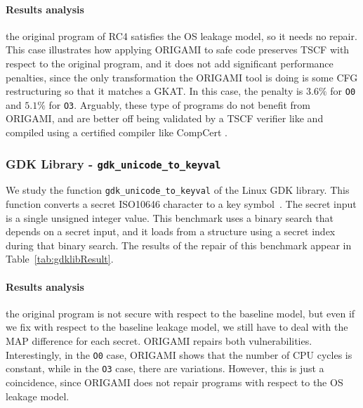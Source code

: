 \paragraph*{Results analysis} the original program of RC4 satisfies the OS leakage model, so it needs no repair. This case illustrates how applying ORIGAMI to safe code preserves TSCF with respect to the original program, and it does not add significant performance penalties, since the only transformation the ORIGAMI tool is doing is some CFG restructuring so that it matches a GKAT. In this case, the penalty is $3.6\%$ for \texttt{O0} and $5.1\%$ for \texttt{O3}. Arguably, these type of programs do not benefit from ORIGAMI, and are better off being validated by a TSCF verifier like \cite{usenix_ctp_verification} and compiled using a certified compiler like CompCert \cite{CompCert}.

\subsubsection{GDK Library - \texttt{gdk\_unicode\_to\_keyval}}
We study the function \texttt{gdk\_unicode\_to\_keyval} of the Linux GDK library. This function converts a secret ISO10646 character to a key symbol~\cite{gdklib}. The secret input %
is a single unsigned integer value. This benchmark uses a binary search that depends on a secret input, and it loads from a structure using a secret index during that binary search.
  The results of the repair of this benchmark appear in Table~\ref{tab:gdklibResult}.

\paragraph*{Results analysis} the original program is not secure with respect to the baseline model, but even if we fix with respect to the baseline leakage model, we still have to deal with the MAP difference for each secret. ORIGAMI repairs both vulnerabilities. Interestingly, in the \texttt{O0} case, ORIGAMI shows that the number of CPU cycles is constant, while in the \texttt{O3} case, there are variations. However, this is just a coincidence, since ORIGAMI does not repair programs with respect to the OS leakage model. %

